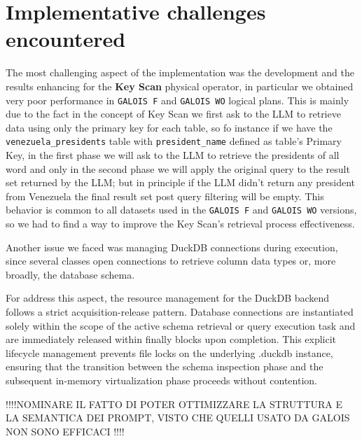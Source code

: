 \section{Implementative challenges encountered}

The most challenging aspect of the implementation was the development and the results enhancing for the \textbf{Key Scan} physical operator, in particular we obtained very poor performance in \texttt{GALOIS F} and \texttt{GALOIS WO} 
logical plans.
This is mainly due to the fact in the concept of Key Scan we first ask to the LLM to retrieve data using only the primary key for each table, so fo instance if we have the \texttt{venezuela\_presidents} table with \texttt{president\_name} defined as table's Primary Key, in the first phase we will ask to the LLM to retrieve the presidents of all word and only in the second phase we will apply the original query to the result set returned by the LLM;
but in principle if the LLM didn't return any president from Venezuela the final result set post query filtering will be empty.
This behavior is common to all datasets used in the \texttt{GALOIS F} and \texttt{GALOIS WO} versions, so we had to find a way to improve the Key Scan's  retrieval process effectiveness.

Another issue we faced was managing DuckDB connections during execution, since several classes open connections to retrieve column data types or, more broadly, the database schema.

For address this aspect, the resource management for the DuckDB backend follows a strict acquisition-release pattern. Database connections are instantiated solely within the scope of the active schema retrieval or query execution task and are immediately released within finally blocks upon completion. This explicit lifecycle management prevents file locks on the underlying .duckdb instance, ensuring that the transition between the schema inspection phase and the subsequent in-memory virtualization phase proceeds without contention.

!!!!NOMINARE IL FATTO DI POTER OTTIMIZZARE LA STRUTTURA E LA SEMANTICA DEI PROMPT, VISTO CHE QUELLI USATO DA GALOIS NON SONO EFFICACI !!!!
